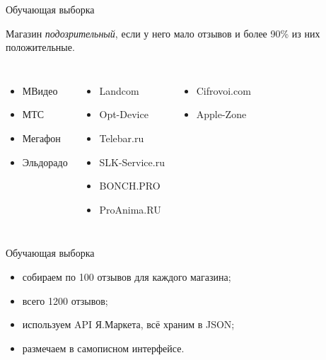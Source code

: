 \documentclass[mathserif,utf8,14pt]{beamer}
\begin{document}
\begin{frame}{Обучающая выборка}
     \addtocounter{framenumber}{-1}
    Магазин \textit{подозрительный}, если у него мало отзывов и более 
    90\% из них положительные.
    \begin{columns}
        \begin{itemize}
            \item МВидео 
            \item МТС 
            \item Мегафон 
            \item Эльдорадо 
        \end{itemize}
        \begin{itemize}
            \item Landcom 
            \item Opt-Device  
            \item Telebar.ru 
            \item SLK-Service.ru 
            \item BONCH.PRO 
            \item ProAnima.RU 
        \end{itemize}
        \begin{itemize}
            \item Cifrovoi.com
            \item Apple-Zone
        \end{itemize}
    \end{columns}
\end{frame}

\begin{frame}{Обучающая выборка}
     \addtocounter{framenumber}{-1}
     \begin{itemize}
         \item собираем по 100 отзывов для каждого магазина;
         \item всего 1200 отзывов;
         \item используем API Я.Маркета, всё храним в JSON;
         \item размечаем в самописном интерфейсе.
     \end{itemize}
\end{frame}
\end{document}
